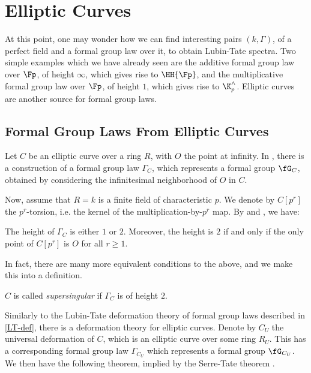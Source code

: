 \section{Elliptic Curves}

At this point, one may wonder how we can find interesting pairs $\left(k, \Gamma\right)$, of a perfect field and a formal group law over it, to obtain Lubin-Tate spectra.
Two simple examples which we have already seen are the additive formal group law over $\Fp$, of height $\infty$, which gives rise to $\HH{\Fp}$, and the multiplicative formal group law over $\Fp$, of height $1$, which gives rise to $\K_p^\wedge$.
Elliptic curves are another source for formal group laws.



\subsection{Formal Group Laws From Elliptic Curves}

Let $C$ be an elliptic curve over a ring $R$, with $O$ the point at infinity.
In \cite[IV]{Sil}, there is a construction of a formal group law $\Gamma_C$, which represents a formal group $\fG_C$, obtained by considering the infinitesimal neighborhood of $O$ in $C$.

Now, assume that $R = k$ is a finite field of characteristic $p$.
We denote by $C\left[p^r\right]$ the $p^r$-torsion, i.e. the kernel of the multiplication-by-$p^r$ map.
By \cite[IV.7.5]{Sil} and \cite[V.3.1]{Sil}, we have:

\begin{proposition}\label{height-torsion}
	The height of $\Gamma_C$ is either $1$ or $2$.
	Moreover, the height is $2$ if and only if the only point of $C\left[p^r\right]$ is $O$ for all $r \geq 1$.
\end{proposition}

In fact, there are many more equivalent conditions to the above, and we make this into a definition.

\begin{definition}
	$C$ is called \emph{supersingular} if $\Gamma_C$ is of height $2$.
\end{definition}

Similarly to the Lubin-Tate deformation theory of formal group laws described in \ref{LT-def}, there is a deformation theory for elliptic curves.
Denote by $C_U$ the universal deformation of $C$, which is an elliptic curve over some ring $R_U$.
This has a corresponding formal group law $\Gamma_{C_U}$ which represents a formal group $\fG_{C_U}$.
We then have the following theorem, implied by the Serre-Tate theorem \cite[1.2.1]{ST}.


